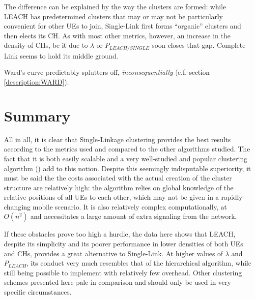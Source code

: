 The difference can be explained by the way the clusters are formed: while LEACH has predetermined clusters that may or may not be particularly convenient for other UEs to join, Single-Link first forms ``organic'' clusters and then elects its CH. As with most other metrics, however, an increase in the density of CHs, be it due to $\lambda$ or $P_{LEACH/SINGLE}$ soon closes that gap. Complete-Link seems to hold its middle ground.

Ward's curve predictably splutters off, \textit{inconsequentially} (c.f. section \ref{description:WARD}).

\section{Summary}

All in all, it is clear that Single-Linkage clustering provides the best results according to the metrics used and compared to the other algorithms studied. The fact that it is both easily scalable and a very well-studied and popular clustering algorithm (\cite{Everitt2011}) add to this notion. Despite this seemingly indisputable superiority, it must be said the the costs associated with the actual creation of the cluster structure are relatively high: the algorithm relies on global knowledge of the relative positions of all UEs to each other, which may not be given in a rapidly-changing mobile scenario. It is also relatively complex computationally, at $O(n^2)$ and necessitates a large amount of extra signaling from the network.

If these obstacles prove too high a hurdle, the data here shows that LEACH, despite its simplicity and its poorer performance in lower densities of both UEs and CHs, provides a great alternative to Single-Link. At higher values of $\lambda$ and $P_{LEACH}$, its conduct very much resembles that of the hierarchical algorithm, while still being possible to implement with relatively few overhead. Other clustering schemes presented here pale in comparison and should only be used in very specific circumstances.
